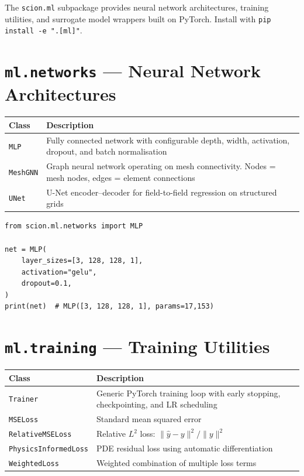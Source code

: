\documentclass[11pt,a4paper]{report}
\begin{document}
The \texttt{scion.ml} subpackage provides neural network architectures, training utilities, and surrogate model wrappers built on PyTorch. Install with \texttt{pip install -e ".[ml]"}.

\section{\texttt{ml.networks} --- Neural Network Architectures}

\begin{longtable}{lp{8cm}}
\toprule
\textbf{Class} & \textbf{Description} \\
\midrule
\texttt{MLP} & Fully connected network with configurable depth, width, activation, dropout, and batch normalisation \\
\texttt{MeshGNN} & Graph neural network operating on mesh connectivity. Nodes = mesh nodes, edges = element connections \\
\texttt{UNet} & U-Net encoder--decoder for field-to-field regression on structured grids \\
\bottomrule
\end{longtable}

\begin{lstlisting}[caption={Creating an MLP}]
from scion.ml.networks import MLP

net = MLP(
    layer_sizes=[3, 128, 128, 1],
    activation="gelu",
    dropout=0.1,
)
print(net)  # MLP([3, 128, 128, 1], params=17,153)
\end{lstlisting}

\section{\texttt{ml.training} --- Training Utilities}

\begin{longtable}{lp{8cm}}
\toprule
\textbf{Class} & \textbf{Description} \\
\midrule
\texttt{Trainer} & Generic PyTorch training loop with early stopping, checkpointing, and LR scheduling \\
\texttt{MSELoss} & Standard mean squared error \\
\texttt{RelativeMSELoss} & Relative $L^2$ loss: $\|\hat{y} - y\|^2 / \|y\|^2$ \\
\texttt{PhysicsInformedLoss} & PDE residual loss using automatic differentiation \\
\texttt{WeightedLoss} & Weighted combination of multiple loss terms \\
\bottomrule
\end{longtable}
\end{document}
